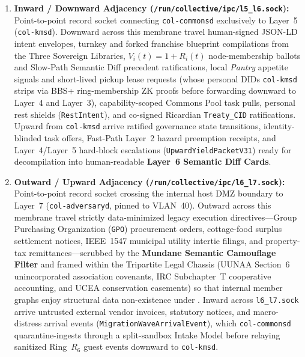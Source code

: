 \begin{enumerate}
\item \textbf{Inward / Downward Adjacency (\texttt{/run/collective/ipc/l5\_l6.sock}):}
      Point-to-point record socket connecting \texttt{col-commonsd} exclusively to Layer~5
      (\texttt{col-kmsd}). Downward across this membrane travel human-signed JSON-LD intent
      envelopes, turnkey and forked franchise blueprint compilations from the Three Sovereign
      Libraries, $V_i(t) = 1 + R_i(t)$ node-membership ballots and Slow-Path Semantic Diff
      precedent ratifications, local \textit{Pantry} appetite signals and short-lived pickup lease
      requests (whose personal DIDs \texttt{col-kmsd} strips via BBS+ ring-membership ZK proofs
      before forwarding downward to Layer~4 and Layer~3), capability-scoped Commons Pool task
      pulls, personal rest shields (\texttt{RestIntent}), and co-signed Ricardian
      \texttt{Treaty\_CID} ratifications. Upward from \texttt{col-kmsd} arrive ratified governance
      state transitions, identity-blinded task offers, Fast-Path Layer~2 hazard preemption
      receipts, and Layer~4/Layer~5 hard-block escalations (\texttt{UpwardYieldPacketV31}) ready
      for decompilation into human-readable \textbf{Layer~6 Semantic Diff Cards}.
\item \textbf{Outward / Upward Adjacency (\texttt{/run/collective/ipc/l6\_l7.sock}):}
      Point-to-point record socket crossing the internal host DMZ boundary to Layer~7
      (\texttt{col-adversaryd}, pinned to VLAN~40). Outward across this membrane travel strictly
      data-minimized legacy execution directives---Group Purchasing Organization (\texttt{GPO})
      procurement orders, cottage-food surplus settlement notices, IEEE~1547 municipal utility
      intertie filings, and property-tax remittances---scrubbed by the \textbf{Mundane Semantic
      Camouflage Filter} and framed within the Tripartite Legal Chassis (UUNAA Section~6
      unincorporated association covenants, IRC Subchapter~T cooperative accounting, and UCEA
      conservation easements) so that internal member graphs enjoy structural data non-existence
      under \textcite{naacp1958}. Inward across \texttt{l6\_l7.sock} arrive untrusted external
      vendor invoices, statutory notices, and macro-distress arrival events
      (\texttt{MigrationWaveArrivalEvent}), which \texttt{col-commonsd} quarantine-ingests
      through a split-sandbox Intake Model before relaying sanitized Ring~$R_6$ guest events
      downward to \texttt{col-kmsd}.
\end{enumerate}


